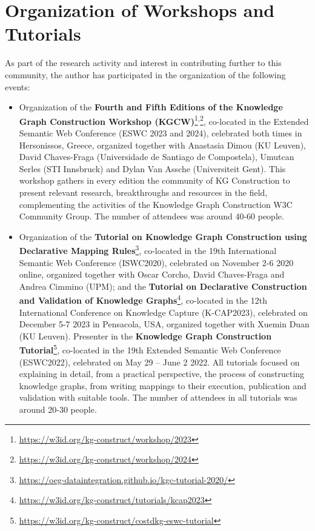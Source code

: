 \section{Organization of Workshops and Tutorials}
As part of the research activity and interest in contributing further to this community, the author has participated in the organization of the following events:
\begin{itemize}
    \item Organization of the \textbf{Fourth and Fifth Editions of the Knowledge Graph Construction Workshop (KGCW)}\footnote{\url{https://w3id.org/kg-construct/workshop/2023}}\textsuperscript{,}\footnote{\url{https://w3id.org/kg-construct/workshop/2024}}, co-located in the Extended Semantic Web Conference (ESWC 2023 and 2024), celebrated both times in Hersonissos, Greece, organized together with Anastasia Dimou (KU Leuven), David Chaves-Fraga (Universidade de Santiago de Compostela), Umutcan Serles (STI Innsbruck) and Dylan Van Assche (Universiteit Gent). This workshop gathers in every edition the community of KG Construction to present relevant research, breakthroughs and resources in the field, complementing the activities of the Knowledge Graph Construction W3C Community Group. The number of attendees was around 40-60 people. 

    \item Organization of the \textbf{Tutorial on Knowledge Graph Construction using Declarative Mapping Rules}\footnote{\url{https://oeg-dataintegration.github.io/kgc-tutorial-2020/}}, co-located in the 19th International Semantic Web Conference (ISWC2020), celebrated on November 2-6 2020 online, organized together with Oscar Corcho, David Chaves-Fraga and Andrea Cimmino (UPM); 
    and the \textbf{Tutorial on Declarative Construction and Validation of Knowledge Graphs}\footnote{\url{https://w3id.org/kg-construct/tutorials/kcap2023}}, co-located in the 12th International Conference on Knowledge Capture (K-CAP2023), celebrated on December 5-7 2023 in Pensacola, USA, organized together with Xuemin Duan (KU Leuven). 
    Presenter in the \textbf{Knowledge Graph Construction Tutorial}\footnote{\url{https://w3id.org/kg-construct/costdkg-eswc-tutorial}}, co-located in the 19th Extended Semantic Web Conference (ESWC2022), celebrated on May 29 – June 2 2022.
    All tutorials focused on explaining in detail, from a practical perspective, the process of constructing knowledge graphs, from writing mappings to their execution, publication and validation with suitable tools. The number of attendees in all tutorials was around 20-30 people. 
\end{itemize}

